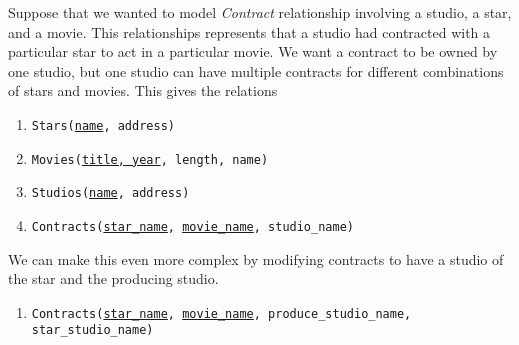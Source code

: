     \begin{example}
      Suppose that we wanted to model \textit{Contract} relationship involving a studio, a star, and a movie. This relationships represents that a studio had contracted with a particular star to act in a particular movie. We want a contract to be owned by one studio, but one studio can have multiple contracts for different combinations of stars and movies. This gives the relations 
      \begin{enumerate}
        \item \texttt{Stars(\underline{name}, address)} 
        \item \texttt{Movies(\underline{title, year}, length, name)} 
        \item \texttt{Studios(\underline{name}, address)} 
        \item \texttt{Contracts(\underline{star\_name}, \underline{movie\_name}, studio\_name)}
      \end{enumerate}

      \begin{figure}[H]
        \centering 
        \caption{} 
        \label{fig:movie-contracts-simple}
      \end{figure}

      We can make this even more complex by modifying contracts to have a studio of the star and the producing studio. 
      \begin{enumerate}
        \item \texttt{Contracts(\underline{star\_name}, \underline{movie\_name}, produce\_studio\_name, star\_studio\_name)}
      \end{enumerate}


\end{example}
